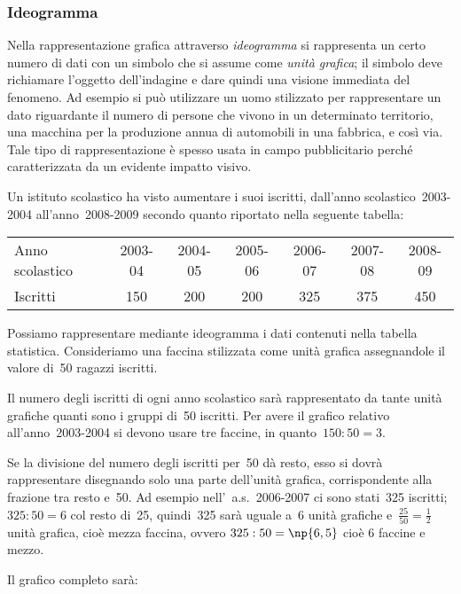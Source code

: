 \subsubsection{Ideogramma}
Nella rappresentazione grafica attraverso \emph{ideogramma} si rappresenta un certo numero di dati con un simbolo che si assume come \emph{unità grafica};
il simbolo deve richiamare l'oggetto dell'indagine e dare quindi una visione immediata del fenomeno.
Ad esempio si può utilizzare un uomo stilizzato per rappresentare un dato riguardante il numero di persone che vivono in un determinato territorio,
una macchina per la produzione annua di automobili in una fabbrica, e così via.
Tale tipo di rappresentazione è spesso usata in campo pubblicitario perché caratterizzata da un evidente impatto visivo.

\begin{exrig}
 \begin{esempio}

Un istituto scolastico ha visto aumentare i suoi iscritti, dall'anno scolastico~2003-2004 all'anno~2008-2009 secondo quanto riportato nella seguente tabella:

\begin{center}
 \begin{tabular}{lcccccc}
 \toprule
 Anno scolastico & 2003-04 & 2004-05 & 2005-06 & 2006-07 & 2007-08 & 2008-09\\
 Iscritti & 150 & 200 & 200 & 325 & 375 & 450\\
 \bottomrule
\end{tabular}
\end{center}

Possiamo rappresentare mediante ideogramma i dati contenuti nella tabella statistica.
Consideriamo una faccina stilizzata come unità grafica assegnandole il valore di~50 ragazzi iscritti.
\begin{center}
 
\end{center}
Il numero degli iscritti di ogni anno scolastico sarà rappresentato da tante unità grafiche quanti sono i gruppi di~50 iscritti.
Per avere il grafico relativo all'anno~2003-2004 si devono usare tre faccine, in quanto~$150:50=3$.
\begin{center}
 
\end{center}
Se la divisione del numero degli iscritti per~50 dà resto, esso si dovrà rappresentare disegnando solo una parte
dell'unità grafica, corrispondente alla frazione tra resto e~50. Ad esempio nell'~a.s.~2006-2007 ci sono stati~325 iscritti; $325:50 = 6$
col resto di~25, quindi~325 sarà uguale a~6 unità grafiche e~$\frac{25}{50}=\frac{1}{2}$ unità grafica, cioè mezza faccina, ovvero $325:50 = \np{6,5}$ cioè 6 faccine e mezzo.
\begin{center}
 
\end{center}

Il grafico completo sarà:
\begin{center}
 
\end{center}
 \end{esempio}
\end{exrig}


